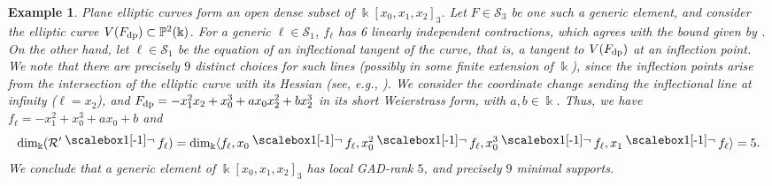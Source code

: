 \documentclass{amsart}
\theoremstyle{plain}
\newtheorem{example}[example]{Example}
\renewcommand{\k}{\Bbbk}
\renewcommand{\S}{\mathcal{S}}
\newcommand{\Ann}{\textnormal{Ann}}
\renewcommand{\P}{\mathbb{P}}
\newcommand{\contract}{\mathbin{\mathpalette\dointprod\relax}}
\newcommand{\dointprod}[2]{%
  \raisebox{\depth}{\scalebox{1}[-1]{$#1\lnot$}}}
\def\P{{\mathbb{P}}}
\def\R{\mathcal{R}}
\def\Ann{\mathrm{Ann}}
\numberwithin{equation}{section}
\begin{document}
\begin{example} \label{ex:genericnotmax}
     Plane elliptic curves form an open dense subset of $\k[x_0,x_1,x_2]_3$.
     Let $F \in \S_3$ be one such a generic element, and consider the elliptic curve $V(F_{\rm dp}) \subset \P^2(\k)$.
     For a generic $\ell \in \S_1$, $f_\ell$ has 6 linearly independent contractions, which agrees with the bound given by .
     On the other hand, let $\ell \in \S_1$ be the equation of an inflectional tangent of the curve, that is, a tangent to $V(F_{\rm dp})$ at an inflection point.
     We note that there are precisely $9$ distinct choices for such lines (possibly in some finite extension of $\k$), since the inflection points arise from the intersection of the elliptic curve with its \emph{Hessian} (see, e.g., \cite{MPT25}). 
     We consider the coordinate change sending the inflectional line at infinity ($\ell = x_2$), and $F_{\rm dp} = - x_1^2x_2 + x_0^3 + a x_0 x_2^2 + b x_2^3$ in its short Weierstrass form, with $a,b \in \k$.
     Thus, we have $f_{\ell} = -x_1^2 + x_0^3 + a x_0 + b$ and
     \[ \dim_{\k} ( \R' \contract f_\ell ) = \dim_{\k} \langle f_\ell, x_0 \contract f_\ell, x_0^2 \contract f_\ell, x_0^3 \contract f_\ell, x_1 \contract f_\ell \rangle = 5. \]
     We conclude that a generic element of $\k[x_0,x_1,x_2]_3$ has local GAD-rank $5$, and precisely $9$ minimal supports.
\end{example}
\end{document}

